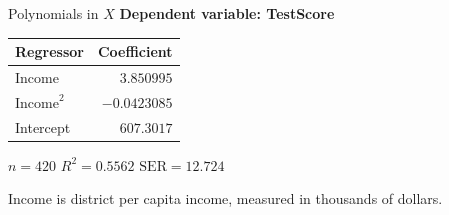 \documentclass[notes,10pt, aspectratio=169]{beamer}
\begin{document}
\begin{frame}{Polynomials in $X$}
\textbf{Dependent variable: TestScore}
\begin{center}
\renewcommand{\arraystretch}{1.2}
\begin{tabular}{lr}
\toprule
Regressor & Coefficient \\
\midrule
$\text{Income}$ & $3.850995$ \\
$\text{Income}^2$ & $-0.0423085$ \\
Intercept & $607.3017$ \\
\bottomrule
\end{tabular}

\medskip
$n=420$ \qquad $R^2=0.5562$ \qquad $\mathrm{SER}=12.724$
\end{center}
\small Income is district per capita income, measured in thousands of dollars.
\end{frame}
\end{document}
